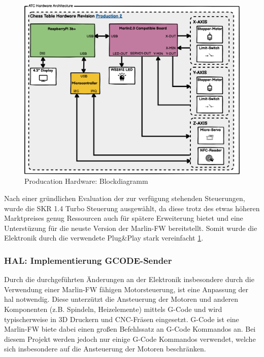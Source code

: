 \begin{figure}
\centering
\includegraphics{images/ATC_Hardware_Architecture_PROD.png}
\caption{Producation Hardware: Blockdiagramm
\label{ATC_Hardware_Architecture_PROD}}
\end{figure}

Nach einer gründlichen Evaluation der zur verfügung stehenden
Steuerungen, wurde die SKR 1.4 Turbo Steuerung ausgewählt, da diese
trotz des etwas höheren Marktpreises genug Ressourcen auch für spätere
Erweiterung bietet und eine Unterstüzung für die neuste Version der
Marlin-FW\cite{marlinfw} bereitstellt. Somit wurde die Elektronik
durch die verwendete Plug\&Play stark vereinfacht
\ref{ATC_Hardware_Architecture_PROD}.

\hypertarget{hal-implementierung-gcode-sender}{%
\subsubsection{HAL: Implementierung
GCODE-Sender}\label{hal-implementierung-gcode-sender}}

Durch die durchgeführten Änderungen an der Elektronik insbesondere durch
die Verwendung einer Marlin-FW\cite{marlinfw} fähigen
Motorsteuerung, ist eine Anpassung der \gls{hal} notwendig. Diese
unterzützt die Ansteuerung der Motoren und anderen Komponenten (z.B.
Spindeln, Heizelemente) mittels G-Code und wird typischerweise in 3D
Druckern und CNC-Fräsen eingesetzt. G-Code ist eine
Marlin-FW\cite{marlinfw} biete dabei einen großen Befehlssatz an
G-Code Kommandos an. Bei diesem Projekt werden jedoch nur einige G-Code
Kommandos verwendet, welche sich insbesondere auf die Ansteuerung der
Motoren beschränken.

